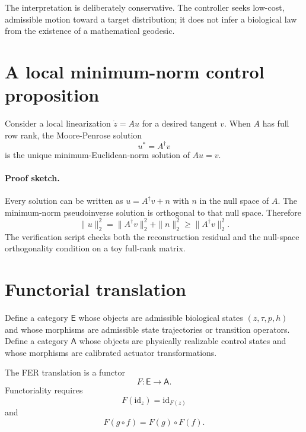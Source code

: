 \documentclass[11pt]{article}
\newcommand{\Id}{\mathrm{id}}
\begin{document}
The interpretation is deliberately conservative. The controller seeks low-cost, admissible motion toward a target distribution; it does not infer a biological law from the existence of a mathematical geodesic.

\section{A local minimum-norm control proposition}
Consider a local linearization $\dot z=A u$ for a desired tangent $v$. When $A$ has full row rank, the Moore-Penrose solution
\begin{equation}
 u^*=A^\dagger v
\label{eq:pseudoinverse}
\end{equation}
is the unique minimum-Euclidean-norm solution of $Au=v$.

\paragraph{Proof sketch.} Every solution can be written as $u=A^\dagger v+n$ with $n$ in the null space of $A$. The minimum-norm pseudoinverse solution is orthogonal to that null space. Therefore
\begin{equation}
 \|u\|_2^2=\|A^\dagger v\|_2^2+\|n\|_2^2\geq\|A^\dagger v\|_2^2.
\label{eq:minnorm}
\end{equation}
The verification script checks both the reconstruction residual and the null-space orthogonality condition on a toy full-rank matrix.

\section{Functorial translation}
Define a category $\mathsf E$ whose objects are admissible biological states $(z,\tau,p,h)$ and whose morphisms are admissible state trajectories or transition operators. Define a category $\mathsf A$ whose objects are physically realizable control states and whose morphisms are calibrated actuator transformations.

The FER translation is a functor
\begin{equation}
 F:\mathsf E\rightarrow\mathsf A.
\label{eq:functor}
\end{equation}
Functoriality requires
\begin{equation}
 F(\Id_z)=\Id_{F(z)}
\label{eq:functorid}
\end{equation}
and
\begin{equation}
 F(g\circ f)=F(g)\circ F(f).
\label{eq:functorcomp}
\end{equation}
\end{document}
